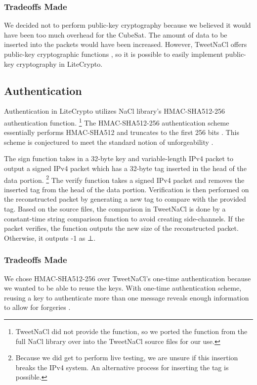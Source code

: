 \documentclass[12pt]{article}
\begin{document}
\begin{multicols}{2}
\subsubsection{Tradeoffs Made}

We decided not to perform public-key cryptography because we believed it would have been too much overhead for the CubeSat. The amount of data to be inserted into the packets would have been increased. However, TweetNaCl offers public-key cryptographic functions \cite{TweetNaClPaper}, so it is possible to easily implement public-key cryptography in LiteCrypto.

\subsection{Authentication}

Authentication in LiteCrypto utilizes NaCl library's HMAC-SHA512-256 authentication function. \footnote{TweetNaCl did not provide the function, so we ported the function from the full NaCl library over into the TweetNaCl source files for our use.} The HMAC-SHA512-256 authentication scheme essentially performs HMAC-SHA512 and truncates to the first 256 bits \cite{NaClSiteAuth}. This scheme is conjectured to meet the standard notion of unforgeability \cite{NaClSiteAuth}.

The sign function takes in a 32-byte key \cite{NaClSiteAuth} and variable-length IPv4 packet to output a signed IPv4 packet which has a 32-byte tag \cite{NaClSiteAuth} inserted in the head of the data portion. \footnote{Because we did get to perform live testing, we are unsure if this insertion breaks the IPv4 system. An alternative process for inserting the tag is possible.} The verify function takes a signed IPv4 packet and removes the inserted tag from the head of the data portion. Verification is then performed on the reconstructed packet by generating a new tag to compare with the provided tag. Based on the source files, the comparison in TweetNaCl is done by a constant-time string comparison function to avoid creating side-channels. If the packet verifies, the function outputs the new size of the reconstructed packet. Otherwise, it outputs -1 as ⊥.

\subsubsection{Tradeoffs Made}

We chose HMAC-SHA512-256 over TweetNaCl's one-time authentication because we wanted to be able to reuse the keys. With one-time authentication scheme, reusing a key to authenticate more than one message reveals enough information to allow for forgeries \cite{NaClSiteOneTimeAuth}.


\end{multicols}
\end{document}
